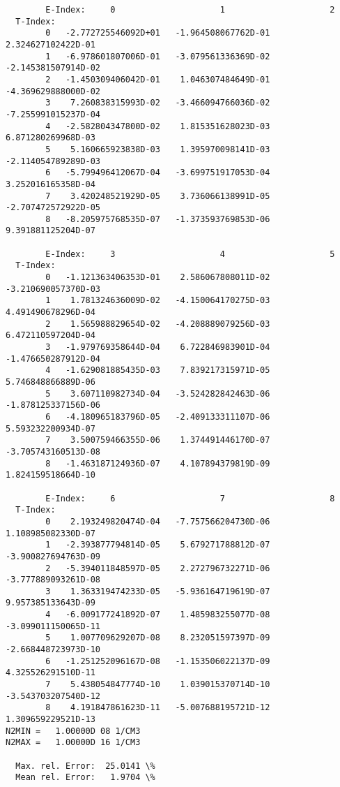 \documentclass[12pt,dvipdfmx]{article}
\begin{document}
{\begin{small}\begin{verbatim}
        E-Index:     0                     1                     2
  T-Index:
        0   -2.772725546092D+01   -1.964508067762D-01    2.324627102422D-01
        1   -6.978601807006D-01   -3.079561336369D-02   -2.145381507914D-02
        2   -1.450309406042D-01    1.046307484649D-01   -4.369629888000D-02
        3    7.260838315993D-02   -3.466094766036D-02   -7.255991015237D-04
        4   -2.582804347800D-02    1.815351628023D-03    6.871280269968D-03
        5    5.160665923838D-03    1.395970098141D-03   -2.114054789289D-03
        6   -5.799496412067D-04   -3.699751917053D-04    3.252016165358D-04
        7    3.420248521929D-05    3.736066138991D-05   -2.707472572922D-05
        8   -8.205975768535D-07   -1.373593769853D-06    9.391881125204D-07

        E-Index:     3                     4                     5
  T-Index:
        0   -1.121363406353D-01    2.586067808011D-02   -3.210690057370D-03
        1    1.781324636009D-02   -4.150064170275D-03    4.491490678296D-04
        2    1.565988829654D-02   -4.208889079256D-03    6.472110597204D-04
        3   -1.979769358644D-04    6.722846983901D-04   -1.476650287912D-04
        4   -1.629081885435D-03    7.839217315971D-05    5.746848866889D-06
        5    3.607110982734D-04   -3.524282842463D-06   -1.878125337156D-06
        6   -4.180965183796D-05   -2.409133311107D-06    5.593232200934D-07
        7    3.500759466355D-06    1.374491446170D-07   -3.705743160513D-08
        8   -1.463187124936D-07    4.107894379819D-09    1.824159518664D-10

        E-Index:     6                     7                     8
  T-Index:
        0    2.193249820474D-04   -7.757566204730D-06    1.108985082330D-07
        1   -2.393877794814D-05    5.679271788812D-07   -3.900827694763D-09
        2   -5.394011848597D-05    2.272796732271D-06   -3.777889093261D-08
        3    1.363319474233D-05   -5.936164719619D-07    9.957385133643D-09
        4   -6.009177241892D-07    1.485983255077D-08   -3.099011150065D-11
        5    1.007709629207D-08    8.232051597397D-09   -2.668448723973D-10
        6   -1.251252096167D-08   -1.153506022137D-09    4.325526291510D-11
        7    5.438054847774D-10    1.039015370714D-10   -3.543703207540D-12
        8    4.191847861623D-11   -5.007688195721D-12    1.309659229521D-13
N2MIN =   1.00000D 08 1/CM3
N2MAX =   1.00000D 16 1/CM3

  Max. rel. Error:  25.0141 \%
  Mean rel. Error:   1.9704 \%


\end{verbatim}
\end{small}}
\end{document}
